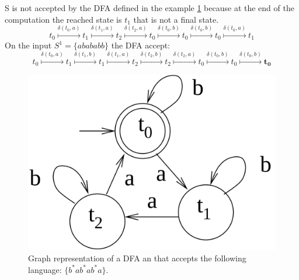 S is not accepted by the DFA defined in the example \ref{amod3Automata} because
at the end of the computation the reached state is $t_1$
that is not a final state.
 \[
 t_0\overset{\delta(t_0,a)}
 {\longmapsto}t_{1}\overset{\delta(t_1,a)}
 {\longmapsto}t_{2}\overset{\delta(t_2,a)}
 {\longmapsto} t_{0}\overset{\delta(t_0,b)}
 {\longmapsto}t_{0}\overset{\delta(t_0,b)}
 {\longmapsto}t_{0}\overset{\delta(t_0,a)}
 {\longmapsto} t_{1}
\]
On the input $S^1=\{abababb\}$ the DFA accept:
 \[
 t_0\overset{\delta(t_0,a)}
 {\longmapsto}t_{1}\overset{\delta(t_1,b)}
 {\longmapsto}t_{1}\overset{\delta(t_1,a)}
 {\longmapsto} t_{2}\overset{\delta(t_2,b)}
 {\longmapsto}t_{2}\overset{\delta(t_2,a)}
 {\longmapsto}t_{0}\overset{\delta(t_0,b)}
 {\longmapsto}t_{0}\overset{\delta(t_0,b)}
 {\longmapsto}\mathbf{t_{0}}
\]
\begin{figure}
\begin{center}
  \includegraphics[scale=0.17]{./images/CA_FDM/amod3Automata}
  \caption[Graph representation of a DFA.]{Graph representation of a DFA an that accepts the following language: $\{b^*ab^*ab^*a\}$.}
  \label{amod3Automata}
\end{center}
\end{figure}



